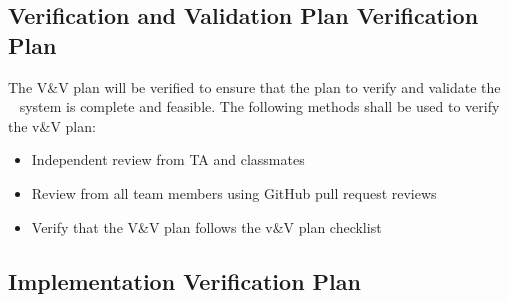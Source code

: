 \documentclass[12pt, titlepage]{article}
\begin{document}
\subsection{Verification and Validation Plan Verification Plan}




The V\&V plan will be verified to ensure that the plan to verify and validate the \progname~ system is complete and feasible. The following methods shall be used to verify the v\&V plan:

\begin{itemize}
  \item Independent review from TA and classmates
  \item Review from all team members using GitHub pull request reviews
    \item Verify that the V\&V plan follows the v\&V plan checklist \cite{Checklist-VnV}
\end{itemize}

\subsection{Implementation Verification Plan}


  
\end{document}
